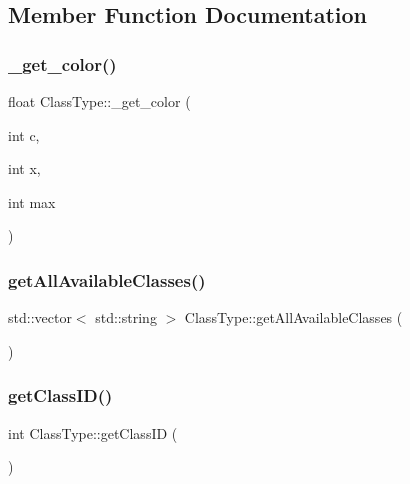 \subsection{Member Function Documentation}
\mbox{\label{struct_class_type_a37ea5c5449bc06ed3f2a327448abe02a}} 
\subsubsection{\texorpdfstring{\+\_\+get\+\_\+color()}{\_get\_color()}}
{\footnotesize\ttfamily float Class\+Type\+::\+\_\+get\+\_\+color (\begin{DoxyParamCaption}\item[{int}]{c,  }\item[{int}]{x,  }\item[{int}]{max }\end{DoxyParamCaption})\hspace{0.3cm}{\ttfamily [protected]}}

\mbox{\label{struct_class_type_a867149836bb99711a7c14fbe7801c9e4}} 
\subsubsection{\texorpdfstring{get\+All\+Available\+Classes()}{getAllAvailableClasses()}}
{\footnotesize\ttfamily std\+::vector$<$ std\+::string $>$ Class\+Type\+::get\+All\+Available\+Classes (\begin{DoxyParamCaption}{ }\end{DoxyParamCaption})}

\mbox{\label{struct_class_type_ab5cc3bb3376a812d051d4726eb4ee063}} 
\subsubsection{\texorpdfstring{get\+Class\+I\+D()}{getClassID()}}
{\footnotesize\ttfamily int Class\+Type\+::get\+Class\+ID (\begin{DoxyParamCaption}{ }\end{DoxyParamCaption})}

